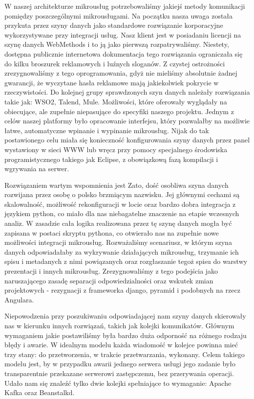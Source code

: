 \documentclass[licencjacka]{pracamgr}
\begin{document}
W naszej architekturze mikrousług potrzebowaliśmy jakiejś metody komunikacji pomiędzy poszczególnymi mikrousługami.
Na początku nasza uwaga została przykuta przez szyny danych jako standardowe rozwiązanie korporacyjne wykorzystywane
przy integracji usług. Nasz klient jest w posiadaniu licencji na szynę danych WebMethods i to ją jako pierwszą
rozpatrywaliśmy. Niestety, dostępna publicznie internetowa dokumentacja tego rozwiązania ograniczała się do kilku
broszurek reklamowych i luźnych sloganów. Z czystej ostrożności zrezygnowaliśmy z tego oprogramowania, gdyż nie
mieliśmy absolutnie żadnej gwarancji, że wyczytane hasła reklamowe mają jakiekolwiek pokrycie w rzeczywistości.
Do kolejnej grupy sprawdzonych szyn danych należały rozwiązania takie jak: WSO2, Talend, Mule. Możliwości, które
oferowały wyglądały na obiecujące, ale zupełnie niepasujące do specyfiki naszego projektu. Jednym z celów naszej
platformy było opracowanie interfejsu, który pozwalałby na możliwie łatwe, automatyczne wpinanie i wypinanie
mikrousług. Nijak do tak postawionego celu miała się konieczność konfigurowania szyny danych przez panel wystawiony w sieci
WWW lub wręcz przy pomocy specjalnego środowiska programistycznego takiego jak Eclipse, z obowiązkową fazą kompilacji
i wgrywania na serwer. 

Rozwiązaniem wartym wspomnienia jest Zato, dość osobliwa szyna danych rozwijana przez osobę o polsko brzmiącym nazwisku. Jej głównymi cechami są skalowalność, możliwość rekonfiguracji w locie oraz bardzo dobra integracja z językiem python, co miało dla nas niebagatelne znaczenie na etapie wczesnych analiz. W zasadzie cała logika realizowana przez tę szynę danych mogła być zapisana w postaci skryptu pythona, co otwierało nas na zupełnie nowe możliwości integracji mikrousług. Rozważaliśmy scenariusz, w którym szyna danych odpowiadałaby za wykrywanie działających mikrousług, trzymanie ich spisu i metadanych z nimi powiązanych oraz rozgłaszanie tegoż spisu do warstwy prezentacji i innych mikrousług. Zrezygnowaliśmy z tego podejścia jako naruszającego zasadę separacji odpowiedzialności oraz wskutek zmian projektowych - rezygnacji z frameworka django, pyramid i podobnych na rzecz Angulara.

Niepowodzenia przy poszukiwaniu odpowiadającej nam szyny danych skierowały nas w kierunku innych rozwiązań, takich jak
kolejki komunikatów. Głównym wymaganiem jakie postawiliśmy była bardzo duża odporność na różnego rodzaju błędy i
awarie. W idealnym modelu każda wiadomość w kolejce powinna mieć trzy stany: do przetworzenia, w trakcie przetwarzania, wykonany. Celem takiego modelu jest, by w przypadku awarii jednego serwera usługi jego zadanie było transparentnie przekazane serwerowi zastępczemu, bez przerywania operacji.
Udało nam się znaleźć tylko dwie kolejki spełniające to wymaganie: Apache Kafka oraz Beanstalkd. %
\end{document}

